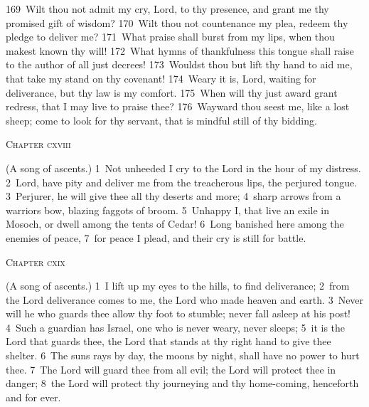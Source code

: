 \documentclass[10pt]{book} %
\begin{document}
\textcolor{benred8}{169}~Wilt thou not admit my cry, Lord, to thy presence, and grant me thy promised gift of wisdom? \textcolor{benred8}{170}~Wilt thou not countenance my plea, redeem thy pledge to deliver me? \textcolor{benred8}{171}~What praise shall burst from my lips, when thou makest known thy will! \textcolor{benred8}{172}~What hymns of thankfulness this tongue shall raise to the author of all just decrees! \textcolor{benred8}{173}~Wouldst thou but lift thy hand to aid me, that take my stand on thy covenant! \textcolor{benred8}{174}~Weary it is, Lord, waiting for deliverance, but thy law is my comfort. \textcolor{benred8}{175}~When will thy just award grant redress, that I may live to praise thee? \textcolor{benred8}{176}~Wayward thou seest me, like a lost sheep; come to look for thy servant, that is mindful still of thy bidding.
\begin{large}\begin{center}\textsc{Chapter cxviii}\end{center}\end{large}
(A song of ascents.)
\textcolor{benred8}{1}~Not unheeded I cry to the Lord in the hour of my distress. \textcolor{benred8}{2}~Lord, have pity and deliver me from the treacherous lips, the perjured tongue. \textcolor{benred8}{3}~Perjurer, he will give thee all thy deserts and more; \textcolor{benred8}{4}~sharp arrows from a warrior\textquotesingle s bow, blazing faggots of broom. \textcolor{benred8}{5}~Unhappy I, that live an exile in Mosoch, or dwell among the tents of Cedar! \textcolor{benred8}{6}~Long banished here among the enemies of peace, \textcolor{benred8}{7}~for peace I plead, and their cry is still for battle.
\begin{large}\begin{center}\textsc{Chapter cxix}\end{center}\end{large}
(A song of ascents.)
\textcolor{benred8}{1}~I lift up my eyes to the hills, to find deliverance; \textcolor{benred8}{2}~from the Lord deliverance comes to me, the Lord who made heaven and earth. \textcolor{benred8}{3}~Never will he who guards thee allow thy foot to stumble; never fall asleep at his post! \textcolor{benred8}{4}~Such a guardian has Israel, one who is never weary, never sleeps; \textcolor{benred8}{5}~it is the Lord that guards thee, the Lord that stands at thy right hand to give thee shelter. \textcolor{benred8}{6}~The sun\textquotesingle s rays by day, the moon\textquotesingle s by night, shall have no power to hurt thee. \textcolor{benred8}{7}~The Lord will guard thee from all evil; the Lord will protect thee in danger; \textcolor{benred8}{8}~the Lord will protect thy journeying and thy home-coming, henceforth and for ever.
\end{document}
